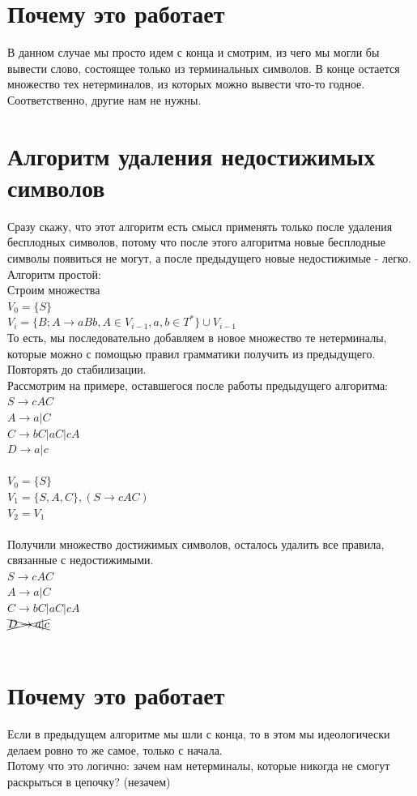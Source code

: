 \documentclass[14pt]{extreport}
\begin{document}
	\section{Почему это работает}
	В данном случае мы просто идем с конца и смотрим, из чего мы могли бы вывести слово,
	состоящее только из терминальных символов. В конце остается множество тех нетерминалов,
	из которых можно вывести что-то годное. Соответственно, другие нам не нужны.
	\section{Алгоритм удаления недостижимых символов}
	Сразу скажу, что этот алгоритм есть смысл применять только после удаления бесплодных
	символов, потому что после этого алгоритма новые бесплодные символы появиться не
	могут, а после предыдущего новые недостижимые - легко.\\
	Алгоритм простой:\\
	Строим множества\\
	$V_0=\{S\}$\\
	$V_i=\{B; A \to aBb, A \in V_{i-1}, a,b \in T^*\} \cup V_{i-1}$\\
	То есть, мы последовательно добавляем в новое множество те нетерминалы, которые
	можно с помощью правил грамматики получить из предыдущего. Повторять до стабилизации.\\
	Рассмотрим на примере, оставшегося после работы предыдущего алгоритма:\\
	$S \to cAC $\\
	$A \to a | C $\\
	$C \to bC | aC | cA $\\
	$D \to a | c$\\\\
	$V_0=\{S\}$\\
	$V_1=\{S, A, C\}, (S \to cAC)$\\
	$V_2=V_1$\\\\
	Получили множество достижимых символов, осталось удалить все правила, связанные с
	недостижимыми.\\
	$S \to cAC $\\
	$A \to a | C $\\
	$C \to bC | aC | cA $\\
	$\xcancel{D \to a | c}$\\\\
	\section{Почему это работает}
	Если в предыдущем алгоритме мы шли с конца, то в этом мы идеологически делаем
	ровно то же самое, только с начала.\\
	Потому что это логично: зачем нам нетерминалы, которые никогда не смогут
	раскрыться в цепочку? (незачем)
\end{document}
